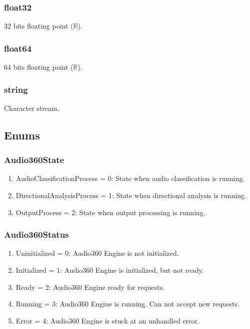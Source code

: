 \documentclass[12pt, titlepage]{article}
\begin{document}
\subsubsection{float32}\label{generic:float32} 32 bits floating point
($\mathbb{R}$).

\subsubsection{float64}\label{generic:float64} 64 bits floating point
($\mathbb{R}$).

\subsubsection{string}\label{generic:string} Character stream.

\subsection{Enums}
\subsubsection{Audio360State}\label{enum:Audio360State}
\begin{enumerate}
  \item AudioClassificationProcess = 0:
    \label{enum:Audio360State:AudioClassificationState}
    State when audio classification is running.
  \item DirectionalAnalysisProcess = 1:
    \label{enum:Audio360State:DirectionalAnalysisState}
    State when directional analysis is running.
  \item OutputProcess = 2:
    \label{enum:Audio360State:OutputProcessState}
    State when output processing is running.
\end{enumerate}

\subsubsection{Audio360Status}\label{enum:Audio360Status}
\begin{enumerate}
  \item Uninitialized = 0: \label{enum:Audio360Status:Uninitialized}
    Audio360 Engine is not initialized.
  \item Initialized = 1: \label{enum:Audio360Status:Initialized}
    Audio360 Engine is initialized, but not ready.
  \item Ready = 2: \label{enum:Audio360Status:Ready} Audio360 Engine ready for
    requests.
  \item Running = 3: \label{enum:Audio360Status:Running}
    Audio360 Engine is running. Can not accept new requests.
  \item Error = 4: \label{enum:Audio360Status:Error}
    Audio360 Engine is stuck at an unhandled error.
\end{enumerate}
\end{document}
